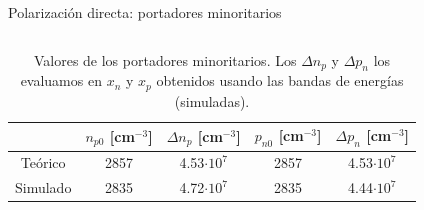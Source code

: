 \documentclass[aspectratio=169,xcolor=dvipsnames]{beamer}
\begin{document}
\begin{frame}{Polarización directa: portadores minoritarios}
\begin{columns}
        \end{columns}
        \begin{table}
            \caption{Valores de los portadores minoritarios. Los $\Delta n_p$ y $\Delta p_n$ los evaluamos en $x_n$ y $x_p$ obtenidos usando las bandas de energías (simuladas).}
            \begin{tabular}{c|cccc}
                & $n_{p0} $  \tiny{[cm$^{-3}$]}  & $\Delta n_p$ \tiny{[cm$^{-3}$]}  & $p_{n0}$ \tiny{[cm$^{-3}$]}  & $\Delta p_n$  \tiny{[cm$^{-3}$]}  \\ \hline
                Teórico & 2857 & 4.53$\cdot 10^7$  & 2857 & 4.53$\cdot 10^7$ \\
                Simulado & 2835 & 4.72$\cdot 10^7$ & 2835 & 4.44$\cdot 10^7$
            \end{tabular}
        \end{table}
\end{frame}
\end{document}
